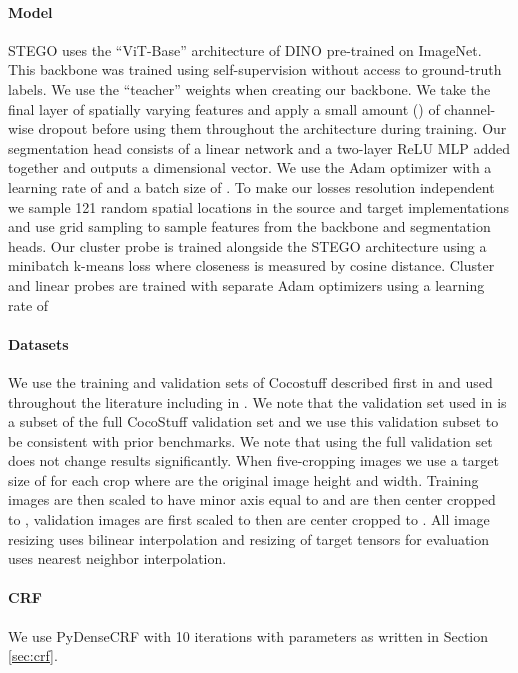 \documentclass{article} \usepackage{iclr2022_conference,times}
\begin{document}
\paragraph{Model} STEGO uses the ``ViT-Base'' architecture of DINO pre-trained on ImageNet. This backbone was trained using self-supervision without access to ground-truth labels. We use the ``teacher'' weights when creating our backbone. We take the final layer of spatially varying features and apply a small amount () of channel-wise dropout \citep{dropout} before using them throughout the architecture during training. Our segmentation head consists of a linear network and a two-layer ReLU MLP added together and outputs a  dimensional vector. We use the Adam optimizer \citep{adam} with a learning rate of  and a batch size of . To make our losses resolution independent we sample 121 random spatial locations in the source and target implementations and use grid sampling \citep{stn} to sample features from the backbone and segmentation heads. Our cluster probe is trained alongside the STEGO architecture using a minibatch k-means loss where closeness is measured by cosine distance. Cluster and linear probes are trained with separate Adam optimizers using a learning rate of 

\paragraph{Datasets} We use the training and validation sets of Cocostuff described first in \cite{iic} and used throughout the literature including in \cite{Cho2021PiCIEUS}. We note that the validation set used in \cite{iic} is a subset of the full CocoStuff validation set and we use this validation subset to be consistent with prior benchmarks. We note that using the full validation set does not change results significantly. When five-cropping images we use a target size of  for each crop where  are the original image height and width. Training images are then scaled to have minor axis equal to  and are then center cropped to , validation images are first scaled to  then are center cropped to . All image resizing uses bilinear interpolation and resizing of target tensors for evaluation uses nearest neighbor interpolation.

\paragraph{CRF} We use PyDenseCRF \citep{fullcrf} with 10 iterations with parameters  as written in Section \ref{sec:crf}.
\end{document}
